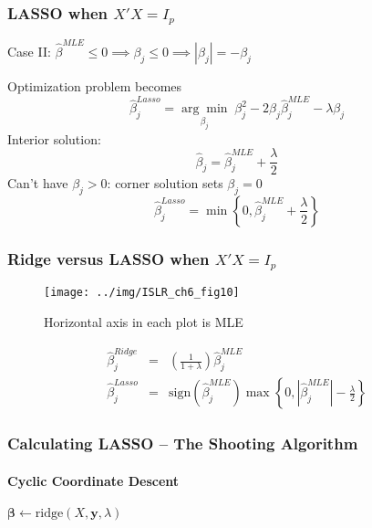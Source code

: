 \begin{frame}
  \frametitle{LASSO when $X'X = I_p$}

  \begin{block}{Case II: $\widehat{\beta}^{MLE}\leq0 \implies \beta_j \leq 0 \implies |\beta_j| = -\beta_j$}
    
Optimization problem becomes
\[\widehat{\beta}^{Lasso}_j = \underset{\beta_j}{\arg \min} \; \beta_j^2 - 2 \beta_j \widehat{\beta}^{MLE}_j - \lambda\beta_j\]
Interior solution:
\[\widehat{\beta}_j = \widehat{\beta}^{MLE}_j + \frac{\lambda}{2}\]
  Can't have $\beta_j>0$: corner solution sets $\beta_j = 0$
\[\widehat{\beta}^{Lasso}_j = \min\left\{0,\widehat{\beta}^{MLE}_j + \frac{\lambda}{2}\right\}\] 
  \end{block}
  
\end{frame}
\begin{frame}
  \frametitle{Ridge versus LASSO when $X'X = I_p$}
\begin{figure}
	\centering
	\texttt{[image: ../img/ISLR\_ch6\_fig10]}
	\caption{Horizontal axis in each plot is MLE}
\end{figure}

\vspace{-3em}
	\begin{eqnarray*}
		\widehat{\beta}^{Ridge}_j &=&  \left(\frac{1}{1+\lambda}\right)\widehat{\beta}^{MLE}_j\\
    \widehat{\beta}^{Lasso}_j &=&\mbox{sign}\left(\widehat{\beta}^{MLE}_j \right)\max\left\{0, \left| \widehat{\beta}^{MLE}_j\right| - \frac{\lambda}{2} \right\}
	\end{eqnarray*}
\end{frame}
\begin{frame}
  \frametitle{Calculating LASSO -- The Shooting Algorithm}
  \framesubtitle{Cyclic Coordinate Descent}

  \begin{algorithm}[H]

  $\boldsymbol{\beta} \leftarrow \mbox{ridge}(X, \mathbf{y}, \lambda)$
 

\end{algorithm}

\end{frame}

